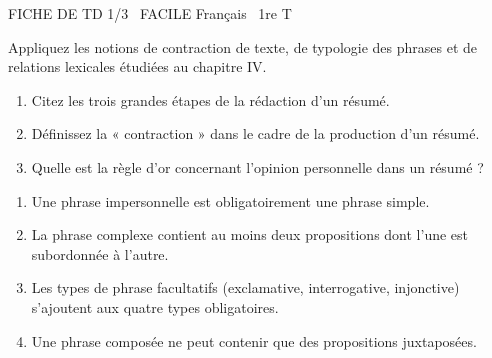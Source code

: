 \documentclass[11pt]{article}
\begin{document}
\begin{tcolorbox}[enhanced,colback=popink,colframe=popink,arc=10pt,boxrule=0pt,left=12pt,right=12pt,top=9pt,bottom=9pt]
{\color{white}\popxbold\small FICHE DE TD 1/3 \textbullet\ FACILE \hfill Français \textbullet\ 1re T\par}
\end{tcolorbox}
\vspace{4pt}
\noindent Appliquez les notions de contraction de texte, de typologie des phrases et de relations lexicales étudiées au chapitre IV.

\begin{exercice}
\begin{enumerate}
    \item Citez les trois grandes étapes de la rédaction d'un résumé.
    \item Définissez la « contraction » dans le cadre de la production d'un résumé.
    \item Quelle est la règle d'or concernant l'opinion personnelle dans un résumé ?
\end{enumerate}
\end{exercice}

\begin{exercice}
\begin{enumerate}
    \item Une phrase impersonnelle est obligatoirement une phrase simple.
    \item La phrase complexe contient au moins deux propositions dont l'une est subordonnée à l'autre.
    \item Les types de phrase facultatifs (exclamative, interrogative, injonctive) s'ajoutent aux quatre types obligatoires.
    \item Une phrase composée ne peut contenir que des propositions juxtaposées.
\end{enumerate}
\end{exercice}
\end{document}
